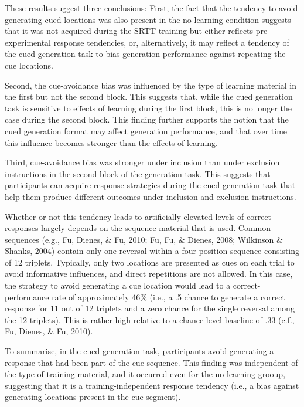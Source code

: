 \documentclass[
  english,
  man]{apa6}
\begin{document}
These results suggest three conclusions:
First, the fact that the tendency to avoid generating cued locations was also present in the no-learning condition suggests that it was not acquired during the SRTT training but either reflects pre-experimental response tendencies, or, alternatively, it may reflect a tendency of the cued generation task to bias generation performance against repeating the cue locations.

Second, the cue-avoidance bias was influenced by the type of learning material in the first but not the second block.
This suggests that, while the cued generation task is sensitive to effects of learning during the first block, this is no longer the case during the second block.
This finding further supports the notion that the cued generation format may affect generation performance, and that over time this influence becomes stronger than the effects of learning.

Third, cue-avoidance bias was stronger under inclusion than under exclusion instructions in the second block of the generation task.
This suggests that participants can acquire response strategies during the cued-generation task that help them produce different outcomes under inclusion and exclusion instructions.

Whether or not this tendency leads to artificially elevated levels of correct responses largely depends on the sequence material that is used.
Common sequences (e.g., Fu, Dienes, \& Fu, 2010; Fu, Fu, \& Dienes, 2008; Wilkinson \& Shanks, 2004) contain only one reversal within a four-position sequence consisting of 12 triplets.
Typically, only two locations are presented as cues on each trial to avoid informative influences, and direct repetitions are not allowed.
In this case, the strategy to avoid generating a cue location would lead to a correct-performance rate of approximately 46\% (i.e., a .5 chance to generate a correct response for 11 out of 12 triplets and a zero chance for the single reversal among the 12 triplets).
This is rather high relative to a chance-level baseline of .33 (c.f., Fu, Dienes, \& Fu, 2010).

To summarise, in the cued generation task, participants avoid generating a response that had been part of the cue sequence. This finding was independent of the type of training material, and it occurred even for the no-learning grooup, suggesting that it is a training-independent response tendency (i.e., a bias against generating locations present in the cue segment).
\end{document}
